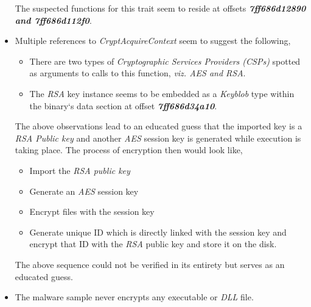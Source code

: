 \documentclass[10pt,a4paper]{article}
\begin{document}
\begin{itemize}
		The suspected functions for this trait seem to reside at offsets \textit{\textbf{7ff686d12890 and 7ff686d112f0}}.
		\item Multiple references to \textit{CryptAcquireContext} seem to suggest the following,
		\begin{itemize}
			\item There are two types of \textit{Cryptographic Services Providers (CSPs)} spotted as arguments to calls to this function, \textit{viz. AES and RSA}.
			\item The \textit{RSA} key instance seems to be embedded as a \textit{Keyblob} type within the binary`s data section at offset \textit{\textbf{7ff686d34a10}}.
		\end{itemize}
		The above observations lead to an educated guess that the imported key is a \textit{RSA Public key} and another \textit{AES} session key is generated while execution is taking place.
		The process of encryption then would look like,
		\begin{itemize}
			\item Import the \textit{RSA public key}
			\item Generate an \textit{AES} session key
			\item Encrypt files with the session key
			\item Generate unique ID which is directly linked with the session key and encrypt that ID with the \textit{RSA} public key and store it on the disk.
		\end{itemize}
		The above sequence could not be verified in its entirety but serves as an educated guess.
		\item The malware sample never encrypts any executable or \textit{DLL} file.
	\end{itemize}
\end{document}
